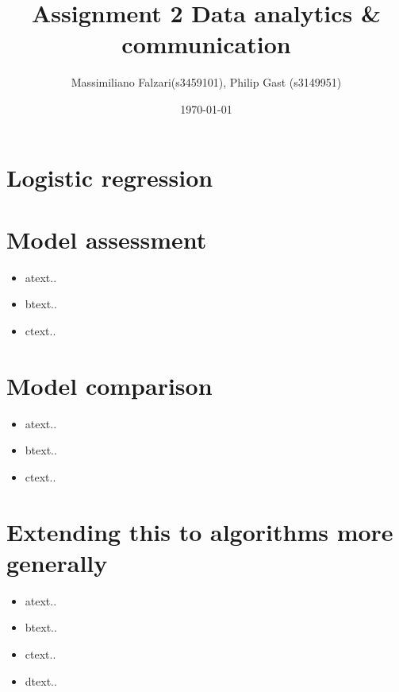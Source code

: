 \documentclass[11pt]{article}
\author{Massimiliano Falzari(s3459101),  Philip Gast (s3149951)}
\date{\today}
\title{Assignment 2 Data analytics \& communication}
\begin{document}
\maketitle
\tableofcontents


\section{Logistic regression}
\label{sec:orgfd3ac9f}

\section{Model assessment}
\label{sec:orga2331a5}
\begin{itemize}
\item atext..
\item btext..
\item ctext..
\end{itemize}


\section{Model comparison}
\label{sec:org282d7a3}
\begin{itemize}
\item atext..
\item btext..
\item ctext..
\end{itemize}

\section{Extending this to algorithms more generally}
\label{sec:org6f3ecfd}
\begin{itemize}
\item atext..
\item btext..
\item ctext..
\item dtext..
\end{itemize}
\end{document}
